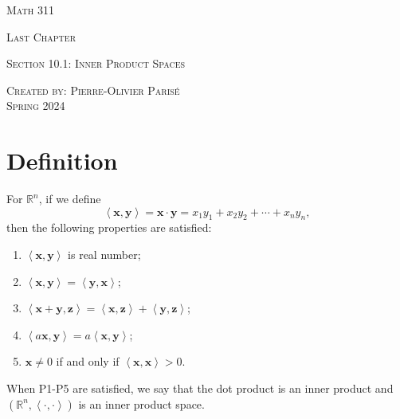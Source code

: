 \documentclass[20pt,a4paper]{extarticle}
\begin{document}
\thispagestyle{empty}

\begin{center}
\vspace*{0.75cm}

{\Huge \textsc{Math 311}}

\vspace*{1.5cm}

{\LARGE \textsc{Last Chapter}} 

\vspace*{0.75cm}

\noindent\textsc{Section 10.1: Inner Product Spaces}

\vspace*{0.25cm}


\begin{footnotesize}

\tableofcontents
\end{footnotesize}

\vfill

\noindent \textsc{Created by: Pierre-Olivier Paris{\'e}} \\
\textsc{Spring 2024}
\end{center}

\newpage

\section{Definition}

For $\mathbb{R}^n$, if we define
	\[
		\left\langle \mathbf{x} , \mathbf{y} \right\rangle = \mathbf{x} \cdot \mathbf{y} = x_1 y_1 + x_2 y_2 + \cdots + x_n y_n ,
	\]
then the following properties are satisfied:
	\begin{enumerate}[label=\Circled{P\arabic*}]
		\item $\left\langle \mathbf{x} , \mathbf{y} \right\rangle$ is real number;
		\item $\left\langle \mathbf{x} , \mathbf{y} \right\rangle = \left\langle \mathbf{y} , \mathbf{x} \right\rangle$;
		\item $\left\langle \mathbf{x} + \mathbf{y} , \mathbf{z} \right\rangle = \left\langle \mathbf{x} , \mathbf{z} \right\rangle + \left\langle \mathbf{y} , \mathbf{z} \right\rangle$;
		\item $\left\langle a \mathbf{x} , \mathbf{y} \right\rangle = a \left\langle \mathbf{x} , \mathbf{y} \right\rangle$;
		\item $\mathbf{x} \neq 0$ if and only if $\left\langle \mathbf{x} , \mathbf{x} \right\rangle > 0$.
	\end{enumerate}
When P1-P5 are satisfied, we say that the dot product is an inner product and $(\mathbb{R}^n , \left\langle \cdot , \cdot \right\rangle)$ is an inner product space.
\end{document}
